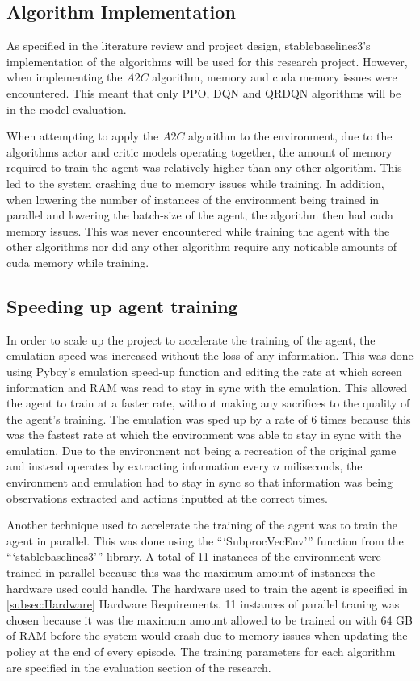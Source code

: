 \subsection{Algorithm Implementation}

As specified in the literature review and project design, stablebaselines3's implementation of the algorithms will be used for this research project. However, when implementing the $A2C$ algorithm, memory and cuda memory issues were encountered. This meant that only PPO, DQN and QRDQN algorithms will be in the model evaluation. 

When attempting to apply the $A2C$ algorithm to the environment, due to the algorithms actor and critic models operating together, the amount of memory required to train the agent was relatively higher than any other algorithm. This led to the system crashing due to memory issues while training. In addition, when lowering the number of instances of the environment being trained in parallel and lowering the batch-size of the agent, the algorithm then had cuda memory issues. This was never encountered while training the agent with the other algorithms nor did any other algorithm require any noticable amounts of cuda memory while training.

\subsection{Speeding up agent training}

In order to scale up the project to accelerate the training of the agent, the emulation speed was increased without the loss of any information. This was done using Pyboy's emulation speed-up function and editing the rate at which screen information and RAM was read to stay in sync with the emulation. This allowed the agent to train at a faster rate, without making any sacrifices to the quality of the agent's training. The emulation was sped up by a rate of 6 times because this was the fastest rate at which the environment was able to stay in sync with the emulation. Due to the environment not being a recreation of the original game and instead operates by extracting information every $n$ miliseconds, the environment and emulation had to stay in sync so that information was being observations extracted and actions inputted at the correct times.

Another technique used to accelerate the training of the agent was to train the agent in parallel. This was done using the ```SubprocVecEnv''' function from the ```stablebaselines3''' library. A total of 11 instances of the environment were trained in parallel because this was the maximum amount of instances the hardware used could handle. The hardware used to train the agent is specified in \ref{subsec:Hardware} Hardware Requirements. 11 instances of parallel traning was chosen because it was the maximum amount allowed to be trained on with 64 GB of RAM before the system would crash due to memory issues when updating the policy at the end of every episode. The training parameters for each algorithm are specified in the evaluation section of the research.

